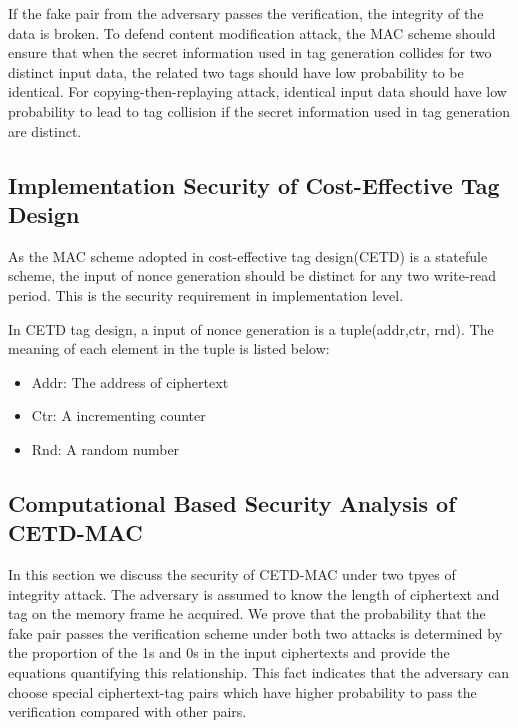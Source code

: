 \documentclass{article}
\begin{document}
If the fake pair from the adversary passes the verification, the integrity of the data is broken. To defend content modification attack, the MAC scheme should ensure that when the secret information used in tag generation collides for two distinct input data, the related two tags should have low probability to be identical. For copying-then-replaying attack, identical input data should have low probability to lead to tag collision if the secret information used in tag generation are distinct. 

\subsection{Implementation Security of Cost-Effective Tag Design}
As the MAC scheme adopted in cost-effective tag design(CETD) is a statefule scheme, the input of nonce generation should be distinct for any two write-read period. This is the security requirement in implementation level. 

In CETD tag design, a input of nonce generation is a tuple(addr,ctr, rnd). The meaning of each element in the tuple is listed below: 
\begin{itemize}
	\item Addr: The address of ciphertext
	\item Ctr: A incrementing counter 
	\item Rnd: A random number
\end{itemize}

\subsection{Computational Based Security Analysis of CETD-MAC}
In this section we discuss the security of CETD-MAC under two tpyes of integrity attack.  The adversary is assumed to know the length of ciphertext and tag on the memory frame he acquired. 
We prove that the probability that the fake pair passes the verification scheme under both two attacks is determined by the proportion of the 1s and 0s in the input ciphertexts and provide the equations quantifying this relationship. This fact indicates that the adversary can choose special ciphertext-tag pairs which have higher probability to pass the verification compared with other pairs.  
\end{document}
